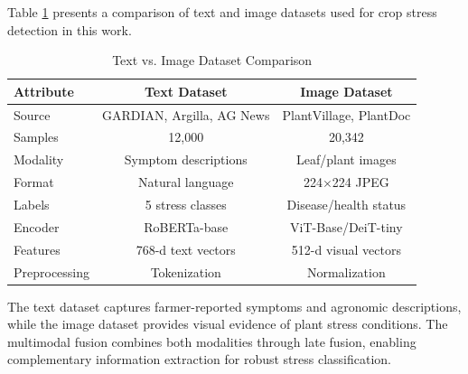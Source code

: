 \documentclass[10pt,journal,compsoc]{IEEEtran}
\begin{document}
Table \ref{tab:text_image_comparison} presents a comparison of text and image datasets used for crop stress detection in this work.

\begin{table}[!t]
\centering
\caption{Text vs. Image Dataset Comparison}
\label{tab:text_image_comparison}
\small
\begin{tabular}{p{1.8cm}cc}
\toprule
\textbf{Attribute} & \textbf{Text Dataset} & \textbf{Image Dataset} \\
\midrule
Source & GARDIAN, Argilla, AG News & PlantVillage, PlantDoc \\
Samples & 12,000 & 20,342 \\
Modality & Symptom descriptions & Leaf/plant images \\
Format & Natural language & 224$\times$224 JPEG \\
Labels & 5 stress classes & Disease/health status \\
Encoder & RoBERTa-base & ViT-Base/DeiT-tiny \\
Features & 768-d text vectors & 512-d visual vectors \\
Preprocessing & Tokenization & Normalization \\
\bottomrule
\end{tabular}
\end{table}

The text dataset captures farmer-reported symptoms and agronomic descriptions, while the image dataset provides visual evidence of plant stress conditions. The multimodal fusion combines both modalities through late fusion, enabling complementary information extraction for robust stress classification.
\end{document}
